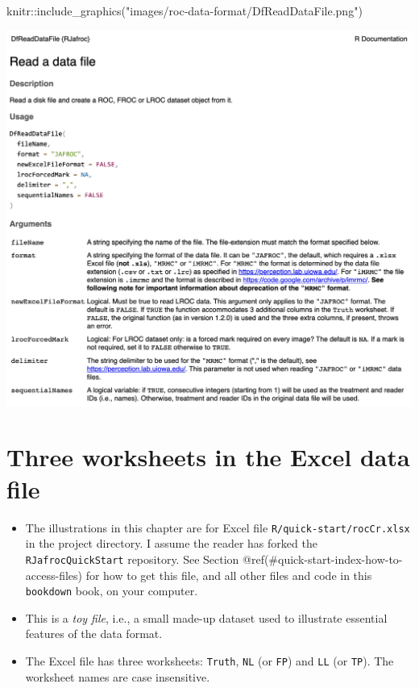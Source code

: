 \documentclass[
]{book}
\newenvironment{Shaded}{\begin{snugshade}}{\end{snugshade}}
\newcommand{\FunctionTok}[1]{\textcolor[rgb]{0.00,0.00,0.00}{#1}}
\newcommand{\NormalTok}[1]{#1}
\newcommand{\SpecialCharTok}[1]{\textcolor[rgb]{0.00,0.00,0.00}{#1}}
\newcommand{\StringTok}[1]{\textcolor[rgb]{0.31,0.60,0.02}{#1}}
\begin{document}
\begin{Shaded}
\begin{Highlighting}[]
\NormalTok{knitr}\SpecialCharTok{::}\FunctionTok{include\_graphics}\NormalTok{(}\StringTok{"images/roc{-}data{-}format/DfReadDataFile.png"}\NormalTok{)}
\end{Highlighting}
\end{Shaded}

\includegraphics[width=22in]{images/roc-data-format/DfReadDataFile}

\hypertarget{quick-start-roc-excel}{%
\section{Three worksheets in the Excel data file}\label{quick-start-roc-excel}}

\begin{itemize}
\item
  The illustrations in this chapter are for Excel file \texttt{R/quick-start/rocCr.xlsx} in the project directory. I assume the reader has forked the \texttt{RJafrocQuickStart} repository. See Section @ref(\#quick-start-index-how-to-access-files) for how to get this file, and all other files and code in this \texttt{bookdown} book, on your computer.
\item
  This is a \emph{toy file}, i.e., a small made-up dataset used to illustrate essential features of the data format.
\item
  The Excel file has three worksheets: \texttt{Truth}, \texttt{NL} (or \texttt{FP}) and \texttt{LL} (or \texttt{TP}). The worksheet names are case insensitive.
\end{itemize}
\end{document}
